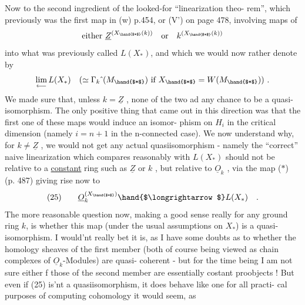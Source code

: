 Now to the second ingredient of the looked-for ``linearization theo-%
rem'', which previously was the first map in (w) p.454, or (V') on page
478, involving maps of 
\[ \text{either } \underline{Z}^{(X_{\hand{$*$}}(k))} \quad \text{or} \quad k^{(X_{\hand{$*$}}(k))} \]
into what was previously called $L(X_*)$, and which we  would now
rather denote by
\[ \underset{\longleftarrow}{\lim}\, L(X_*) \quad ( \simeq \Gamma_k\,\hat{}\,(M_{\hand{$*$}}) \ \text{if} \ X_{\hand{$*$}} = W(M_{\hand{$*$}}) ) \ . \]
We made sure that, unless $k=\underline{Z}$ , none of the two ad any chance to be
a quasi-isomorphism. The only positive thing that came out in this
direction was that the first one of these maps would induce an isomor-%
phism on $H_i$ in the critical dimension (namely $i=n+1$ in the n-connected
case). We now understand why,  for $k \neq \underline{Z}$ , we would not get any
actual quasiisomorphism - namely the ``correct'' naive linearization
which compares reasonably with $L(X_*)$ should not be relative to a
\uline{constant} ring such as $\underline{Z}$ or $k$ , but relative to $\underline{O}_k$ , via the map
($*$) (p. 487) giving rise now to
\[ (25) \qquad \underline{O}_k^{(X_{\hand{$*$}})} \hand{$\longrightarrow$} L(X_*) \quad . \]
The more reasonable question now, making a good sense really for any
ground ring $k$, is whether this map (under the usual assumptions on $X_*$)
is a quasi-isomorphism. I would'nt really bet it is, as I have some
doubts as to whether the homology sheaves of the first member (both
\hand{(} of course being viewed as chain complexes of $\underline{O}_k$-Modules) are quasi-
coherent - but for the time being I am not sure either f those of
the second member are essentially costant proobjects ! But even if
(25) is'nt a quasiisomorphism, it does behave like one for all practi-%
cal purposes of computing cohomology\hand{,} it would seem, as 

